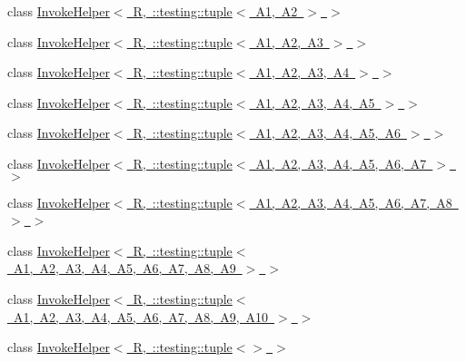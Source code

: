 \begin{DoxyCompactItemize}
\item 
class \mbox{\hyperlink{classtesting_1_1internal_1_1InvokeHelper_3_01R_00_01_1_1testing_1_1tuple_3_01A1_00_01A2_01_4_01_4}{Invoke\+Helper$<$ R, \+::testing\+::tuple$<$ A1, A2 $>$ $>$}}
\item 
class \mbox{\hyperlink{classtesting_1_1internal_1_1InvokeHelper_3_01R_00_01_1_1testing_1_1tuple_3_01A1_00_01A2_00_01A3_01_4_01_4}{Invoke\+Helper$<$ R, \+::testing\+::tuple$<$ A1, A2, A3 $>$ $>$}}
\item 
class \mbox{\hyperlink{classtesting_1_1internal_1_1InvokeHelper_3_01R_00_01_1_1testing_1_1tuple_3_01A1_00_01A2_00_01A3_00_01A4_01_4_01_4}{Invoke\+Helper$<$ R, \+::testing\+::tuple$<$ A1, A2, A3, A4 $>$ $>$}}
\item 
class \mbox{\hyperlink{classtesting_1_1internal_1_1InvokeHelper_3_01R_00_01_1_1testing_1_1tuple_3_01A1_00_01A2_00_01A3_00_01A4_00_01A5_01_4_01_4}{Invoke\+Helper$<$ R, \+::testing\+::tuple$<$ A1, A2, A3, A4, A5 $>$ $>$}}
\item 
class \mbox{\hyperlink{classtesting_1_1internal_1_1InvokeHelper_3_01R_00_01_1_1testing_1_1tuple_3_01A1_00_01A2_00_01A3_129338555c00c55487bfe9fa59e479ab}{Invoke\+Helper$<$ R, \+::testing\+::tuple$<$ A1, A2, A3, A4, A5, A6 $>$ $>$}}
\item 
class \mbox{\hyperlink{classtesting_1_1internal_1_1InvokeHelper_3_01R_00_01_1_1testing_1_1tuple_3_01A1_00_01A2_00_01A3_39d55f6ea73f4d04a19cf9b6bab3a605}{Invoke\+Helper$<$ R, \+::testing\+::tuple$<$ A1, A2, A3, A4, A5, A6, A7 $>$ $>$}}
\item 
class \mbox{\hyperlink{classtesting_1_1internal_1_1InvokeHelper_3_01R_00_01_1_1testing_1_1tuple_3_01A1_00_01A2_00_01A3_3417e5c524ad74e18b0b4b31a005e438}{Invoke\+Helper$<$ R, \+::testing\+::tuple$<$ A1, A2, A3, A4, A5, A6, A7, A8 $>$ $>$}}
\item 
class \mbox{\hyperlink{classtesting_1_1internal_1_1InvokeHelper_3_01R_00_01_1_1testing_1_1tuple_3_01A1_00_01A2_00_01A3_1c5f66c8b5e7674a520f1ea38507628c}{Invoke\+Helper$<$ R, \+::testing\+::tuple$<$ A1, A2, A3, A4, A5, A6, A7, A8, A9 $>$ $>$}}
\item 
class \mbox{\hyperlink{classtesting_1_1internal_1_1InvokeHelper_3_01R_00_01_1_1testing_1_1tuple_3_01A1_00_01A2_00_01A3_9a04af5e172e051ec3c8faaa2f50b42f}{Invoke\+Helper$<$ R, \+::testing\+::tuple$<$ A1, A2, A3, A4, A5, A6, A7, A8, A9, A10 $>$ $>$}}
\item 
class \mbox{\hyperlink{classtesting_1_1internal_1_1InvokeHelper_3_01R_00_01_1_1testing_1_1tuple_3_4_01_4}{Invoke\+Helper$<$ R, \+::testing\+::tuple$<$$>$ $>$}}

\end{DoxyCompactItemize}
